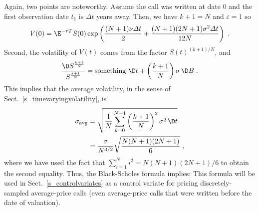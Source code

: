 Again, two points are noteworthy.  Assume the call was written at date 0 and the first observation date $t_1$ is $\varDelta t$ years away.  Then, we have $k+1=N$ and $\varepsilon=1$ so
\begin{equation}\label{asianV02}
V(0) = \E^{-rT}S(0)\exp\left( \frac{(N+1)\nu\varDelta t}{2} + \frac{(N+1)(2N+1)\sigma^2\varDelta t}{12N} \right)\;.
\end{equation}
Second, the volatility of $V(t)$ comes from the factor $S(t)^{(k+1)/N}$, and
$$\frac{ \D S^{\frac{k+1}{N}}}{S^{\frac{k+1}{N}}} = \text{something}\,\,\D t + \left(\frac{k+1}{N}\right)\sigma\,\D B\; .$$
This implies that the average volatility, in the sense of Sect.~\ref{s_timevaryingvolatility}, is
\begin{align}
\sigma_{\text{avg}} &= \sqrt{\frac{1}{N}\sum_{k=0}^{N-1} \left(\frac{k+1}{N}\right)^2\sigma^2\,\D t}\notag\\
&=\frac{\sigma}{N^{3/2}}\sqrt{\frac{N(N+1)(2N+1)}{6}}\;,\label{asiansigmaavg}
\end{align}
where we have used the fact that $\sum_{i=1}^N i^2 = N(N+1)(2N+1)/6$ to obtain the second equality.
Thus, the Black-Scholes formula implies:
This formula will be used in Sect.~\ref{s_controlvariates} as a control variate for pricing discretely-sampled average-price calls (even average-price calls that were written before the date of valuation).

